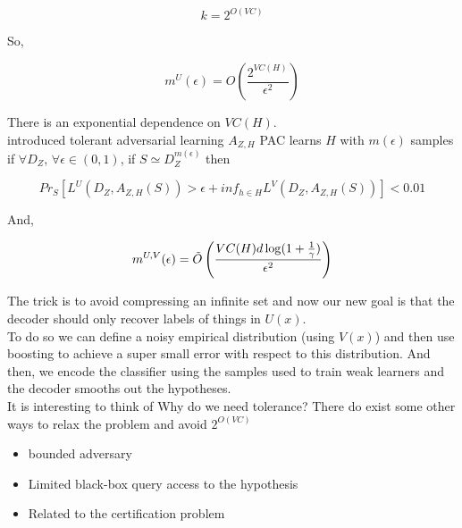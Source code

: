 \documentclass{article}
\begin{document}
\begin{equation*}
    k = 2^{O(VC)}
\end{equation*}

\noindent So,

\begin{equation}
    m^U(\epsilon) = O \left( \frac{2^{VC(H)}}{\epsilon^2} \right)
\end{equation}

\noindent There is an exponential dependence on $VC(H)$.\\

\noindent \citet{https://doi.org/10.48550/arxiv.2203.00849} introduced tolerant adversarial learning $A_{Z,H}$ PAC learns $H$ with $m(\epsilon)$ samples\\

\noindent if $\forall D_Z$, $\forall \epsilon \in (0,1)$, if $S \simeq D_Z^{m(\epsilon)}$ then

\begin{equation}
    Pr_S[L^U(D_Z,A_{Z,H}(S)) > \epsilon + inf_{h \in H} L^V(D_Z,A_{Z,H}(S))] < 0.01
\end{equation}

\noindent And,

\begin{equation}
    m^{U,V}(\epsilon) = \Tilde{O} \left( \frac{VC(H)d\log(1+\frac{1}{\gamma})}{\epsilon ^2} \right)
\end{equation}

\noindent The trick is to avoid compressing an infinite set and now our new goal is that the decoder should only recover labels of things in $U(x)$.\\

\noindent To do so we can define a noisy empirical distribution (using $V(x)$) and then use boosting to achieve a super small error with respect to this distribution. And then, we encode the classifier using the samples used to train weak learners and the decoder smooths out the hypotheses.\\

\noindent It is interesting to think of Why do we need tolerance? There do exist some other ways to relax the problem and avoid $2^{O(VC)}$

\begin{itemize}
    \item bounded adversary
    \item Limited black-box query access to the hypothesis
    \item Related to the certification problem
\end{itemize}
\end{document}
